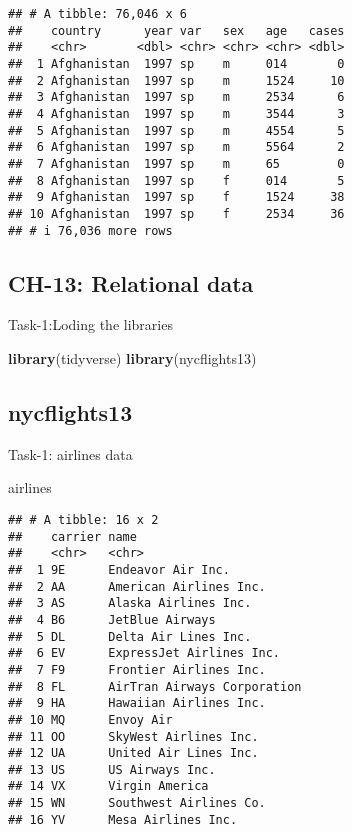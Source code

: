 \documentclass[
]{article}
\newenvironment{Shaded}{\begin{snugshade}}{\end{snugshade}}
\newcommand{\FunctionTok}[1]{\textcolor[rgb]{0.13,0.29,0.53}{\textbf{#1}}}
\newcommand{\NormalTok}[1]{#1}
\begin{document}
\begin{verbatim}
## # A tibble: 76,046 x 6
##    country      year var   sex   age   cases
##    <chr>       <dbl> <chr> <chr> <chr> <dbl>
##  1 Afghanistan  1997 sp    m     014       0
##  2 Afghanistan  1997 sp    m     1524     10
##  3 Afghanistan  1997 sp    m     2534      6
##  4 Afghanistan  1997 sp    m     3544      3
##  5 Afghanistan  1997 sp    m     4554      5
##  6 Afghanistan  1997 sp    m     5564      2
##  7 Afghanistan  1997 sp    m     65        0
##  8 Afghanistan  1997 sp    f     014       5
##  9 Afghanistan  1997 sp    f     1524     38
## 10 Afghanistan  1997 sp    f     2534     36
## # i 76,036 more rows
\end{verbatim}

\hypertarget{ch-13-relational-data}{%
\subsection{CH-13: Relational data}\label{ch-13-relational-data}}

Task-1:Loding the libraries

\begin{Shaded}
\begin{Highlighting}[]
\FunctionTok{library}\NormalTok{(tidyverse)}
\FunctionTok{library}\NormalTok{(nycflights13)}
\end{Highlighting}
\end{Shaded}

\hypertarget{nycflights13}{%
\subsection{nycflights13}\label{nycflights13}}

Task-1: airlines data

\begin{Shaded}
\begin{Highlighting}[]
\NormalTok{airlines}
\end{Highlighting}
\end{Shaded}

\begin{verbatim}
## # A tibble: 16 x 2
##    carrier name                       
##    <chr>   <chr>                      
##  1 9E      Endeavor Air Inc.          
##  2 AA      American Airlines Inc.     
##  3 AS      Alaska Airlines Inc.       
##  4 B6      JetBlue Airways            
##  5 DL      Delta Air Lines Inc.       
##  6 EV      ExpressJet Airlines Inc.   
##  7 F9      Frontier Airlines Inc.     
##  8 FL      AirTran Airways Corporation
##  9 HA      Hawaiian Airlines Inc.     
## 10 MQ      Envoy Air                  
## 11 OO      SkyWest Airlines Inc.      
## 12 UA      United Air Lines Inc.      
## 13 US      US Airways Inc.            
## 14 VX      Virgin America             
## 15 WN      Southwest Airlines Co.     
## 16 YV      Mesa Airlines Inc.
\end{verbatim}
\end{document}
